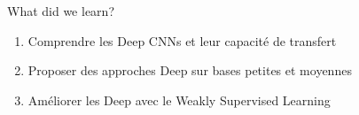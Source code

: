 \begin{frame}{What did we learn?}
	
	
	\begin{enumerate}
		\item Comprendre les Deep CNNs et leur capacité de transfert
		\item Proposer des approches Deep sur bases petites et moyennes
		\item Améliorer les Deep avec le Weakly Supervised Learning
	\end{enumerate}
	
\end{frame}




